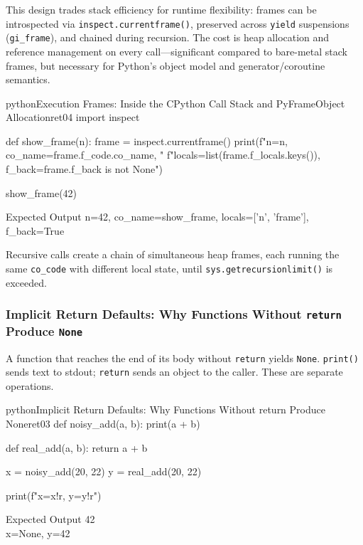 \documentclass[a4paper,twoside]{report}
\begin{document}
This design trades stack efficiency for runtime flexibility: frames can be introspected via \texttt{inspect.currentframe()}, preserved across \texttt{yield} suspensions (\texttt{gi\_frame}), and chained during recursion. The cost is heap allocation and reference management on every call---significant compared to bare-metal stack frames, but necessary for Python's object model and generator/coroutine semantics.

\begin{codebox}[]{python}{Execution Frames: Inside the CPython Call Stack and PyFrameObject Allocation}{ret04}
import inspect

def show_frame(n):
    frame = inspect.currentframe()
    print(f"n={n}, co_name={frame.f_code.co_name}, "
          f"locals={list(frame.f_locals.keys())}, f_back={frame.f_back is not None}")

show_frame(42)
\end{codebox}


\begin{iobox}{Expected Output}
n=42, co\_name=show\_frame, locals=['n', 'frame'], f\_back=True \\
\end{iobox}




Recursive calls create a chain of simultaneous heap frames, each running the same \texttt{co\_code} with different local state, until \texttt{sys.getrecursionlimit()} is exceeded.

\subsubsection{Implicit Return Defaults: Why Functions Without \texttt{return} Produce \texttt{None}}

A function that reaches the end of its body without \texttt{return} yields \texttt{None}. \texttt{print()} sends text to stdout; \texttt{return} sends an object to the caller. These are separate operations.

\begin{codebox}[]{python}{Implicit Return Defaults: Why Functions Without return Produce None}{ret03}
def noisy_add(a, b):
    print(a + b)

def real_add(a, b):
    return a + b

x = noisy_add(20, 22)
y = real_add(20, 22)

print(f"x={x!r}, y={y!r}")
\end{codebox}


\begin{iobox}{Expected Output}
42 \\
x=None, y=42 \\
\end{iobox}
\end{document}

